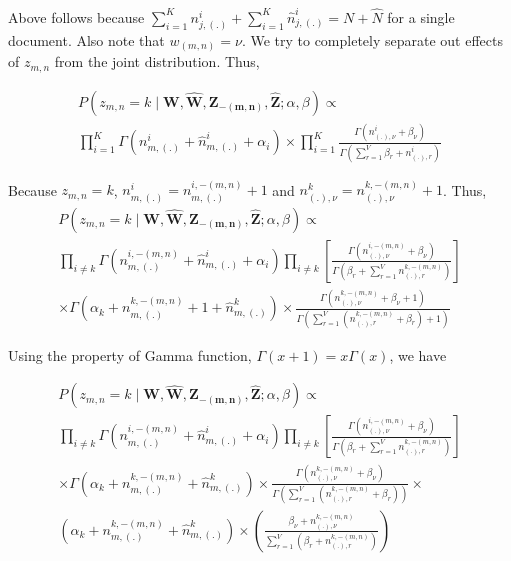 \documentclass[a4paper]{article}
\begin{document}
Above follows because  $\sum_{i=1}^{K} n_{j,(.)}^{i} + \sum_{i=1}^{K} \hat{n}_{j,(.)}^{i} = N + \hat{N}$  for a single document. Also note that $w_{(m,n)} = \nu$. We try to completely separate out effects of $z_{m,n}$ from the joint distribution. Thus, 

\begin{multline}
P(z_{m,n} = k \mid \mathbf{W}, \mathbf{\hat{W}}, \mathbf{Z_{-(m,n)}}, \mathbf{\hat{Z}} ; \alpha, \beta ) 
 \propto \\ \prod_{i=1}^{K} \Gamma(n_{m,(.)}^{i} + \hat{n}_{m,(.)}^{i} + \alpha_{i} ) \times \prod_{i=1}^{K} \frac{\Gamma(n_{(.),\nu}^{i} + \beta_{\nu} )}{\Gamma(\sum_{r=1}^{V} \beta_{r} + n_{(.),r}^{i})}\end{multline}
 
 Because $z_{m,n} = k$, $n_{m,(.)}^{i} = n_{m,(.)}^{i,-(m,n)} + 1$ and $n_{(.),\nu}^{k} = n_{(.),\nu}^{k,-(m,n)}+1$. Thus, 
 \begin{multline}
 P(z_{m,n} = k \mid \mathbf{W}, \mathbf{\hat{W}}, \mathbf{Z_{-(m,n)}}, \mathbf{\hat{Z}} ; \alpha, \beta ) 
 \propto \\ 
 \prod_{i \neq k} \Gamma(n_{m,(.)}^{i,-(m,n)} + \hat{n}_{m,(.)}^{i} + \alpha_{i}  ) \prod_{i \neq k} \left[ \frac{\Gamma(n_{(.),\nu}^{i,-(m,n)} + \beta_{\nu})} {\Gamma(\beta_{r} + \sum_{r=1}^{V} n_{(.),r}^{k, -(m,n)} )} \right] \\
 \times \Gamma(\alpha_{k} + n_{m,(.)}^{k,-(m,n)}  + 1 + \hat{n}_{m,(.)}^{k}) \times \frac{\Gamma(n_{(.),\nu}^{k, -(m,n)} + \beta_{\nu} + 1)}{\Gamma(\sum_{r=1}^{V} (n_{(.),r}^{k,-(m,n)} + \beta_{r} )  + 1)}
 \end{multline}
 
 Using the property of Gamma function, $\Gamma(x+1) = x\Gamma(x)$, we have
 
 \begin{multline}
 P(z_{m,n} = k \mid \mathbf{W}, \mathbf{\hat{W}}, \mathbf{Z_{-(m,n)}}, \mathbf{\hat{Z}} ; \alpha, \beta ) 
 \propto \\ 
 \prod_{i \neq k} \Gamma(n_{m,(.)}^{i,-(m,n)} + \hat{n}_{m,(.)}^{i} + \alpha_{i}  ) \prod_{i \neq k} \left[ \frac{\Gamma(n_{(.),\nu}^{i,-(m,n)} + \beta_{\nu})} {\Gamma(\beta_{r} + \sum_{r=1}^{V} n_{(.),r}^{k, -(m,n)} )} \right] \\
 \times \Gamma(\alpha_{k} + n_{m,(.)}^{k,-(m,n)}  + \hat{n}_{m,(.)}^{k}) \times \frac{\Gamma(n_{(.),\nu}^{k, -(m,n)} + \beta_{\nu})}{\Gamma(\sum_{r=1}^{V} (n_{(.),r}^{k,-(m,n)} + \beta_{r} ))} \times \\
 \left( \alpha_{k} + n_{m,(.)}^{k,-(m,n)} + \hat{n}_{m,(.)}^{k} \right) \times \left( \frac{\beta_{\nu} + n_{(.),\nu}^{k,-(m,n)}}{\sum_{r=1}^{V}(\beta_{r} + n_{(.),r}^{k,-(m,n)})} \right)
 \end{multline}
 
\end{document}
